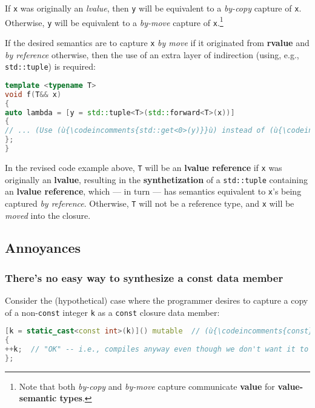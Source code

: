 \noindent If \texttt{x} was originally an \emph{lvalue}, then \texttt{y} will be
equivalent to a \emph{by-copy} capture of \texttt{x}. Otherwise,
\texttt{y} will be equivalent to a \emph{by-move} capture of
\texttt{x}.{\cprotect\footnote{Note that both \emph{by-copy} and
\emph{by-move} capture communicate \textbf{value} for
\textbf{value-semantic types}.}}

If the desired semantics are to capture \texttt{x} \emph{by move} if it
originated from \textbf{rvalue} and \emph{by reference} otherwise, then
the use of an extra layer of indirection (using, e.g.,
\texttt{std::tuple}) is required:

\begin{lstlisting}[language=C++]
template <typename T>
void f(T&& x)
{
auto lambda = [y = std::tuple<T>(std::forward<T>(x))]
{
// ... (Use (ù{\codeincomments{std::get<0>(y)}}ù) instead of (ù{\codeincomments{y}}ù) in this lambda body.)
};
}
\end{lstlisting}

\noindent In the revised code example above, \texttt{T} will be an \textbf{lvalue
reference} if \texttt{x} was originally an \textbf{lvalue}, resulting in
the \textbf{synthetization} of a \texttt{std::tuple} containing an
\textbf{lvalue reference}, which --- in turn --- has semantics
equivalent to \texttt{x}'s being captured \emph{by reference}.
Otherwise, \texttt{T} will not be a reference type, and \texttt{x} will
be \emph{moved} into the closure.

\subsection[Annoyances]{Annoyances}\label{annoyances-lambdacapture}

\subsubsection[There’s no easy way to synthesize a {\ttfamily const} data member]{There’s no easy way to synthesize a {\SubsubsecCode const} data member}\label{there’s-no-easy-way-to-synthesize-a-const-data-member}

Consider the (hypothetical) case where the programmer desires to capture
a copy of a non-\texttt{const} integer \texttt{k} as a \texttt{const}
closure data member:

\begin{lstlisting}[language=C++]
[k = static_cast<const int>(k)]() mutable  // (ù{\codeincomments{const}}ù) is ignored
{
++k;  // "OK" -- i.e., compiles anyway even though we don't want it to
};
\end{lstlisting}


